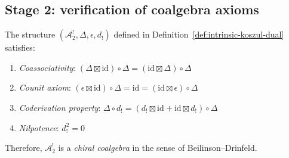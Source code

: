 \subsection{Stage 2: verification of coalgebra axioms}

\begin{theorem}
\label{thm:coalgebra-axioms-verified}

The structure $(\mathcal{A}_2^!, \Delta, \epsilon, d_!)$ defined in Definition~\ref{def:intrinsic-koszul-dual} satisfies:

\begin{enumerate}
\item \emph{Coassociativity}: $(\Delta \boxtimes \mathrm{id}) \circ \Delta = (\mathrm{id} \boxtimes \Delta) \circ \Delta$

\item \emph{Counit axiom}: $(\epsilon \boxtimes \mathrm{id}) \circ \Delta = \mathrm{id} = (\mathrm{id} \boxtimes \epsilon) \circ \Delta$

\item \emph{Coderivation property}: $\Delta \circ d_! = (d_! \boxtimes \mathrm{id} + \mathrm{id} \boxtimes d_!) \circ \Delta$

\item \emph{Nilpotence}: $d_!^2 = 0$
\end{enumerate}

Therefore, $\mathcal{A}_2^!$ is a \emph{chiral coalgebra} in the sense of Beilinson--Drinfeld.
\end{theorem}

